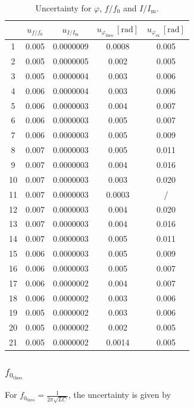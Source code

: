 \documentclass{article}
\begin{document}
\begin{table}[H]\centering
    \begin{tabular}{ccccc}
        \toprule
           & $u_{f/f_0}$ & $u_{I/I_\text{m}}$ & $u_{\varphi_\text{theo}}\,[\text{rad}]$ & $u_{\varphi_\text{ex}}\,[\text{rad}]$ \\
        \midrule
1 & 0.005 & 0.0000009 & 0.0008 & 0.005 \\
2 & 0.005 & 0.0000005 & 0.002 & 0.005 \\
3 & 0.005 & 0.0000004 & 0.003 & 0.006 \\
4 & 0.006 & 0.0000004 & 0.003 & 0.006 \\
5 & 0.006 & 0.0000003 & 0.004 & 0.007 \\
6 & 0.006 & 0.0000003 & 0.005 & 0.007 \\
7 & 0.006 & 0.0000003 & 0.005 & 0.009 \\
8 & 0.007 & 0.0000003 & 0.005 & 0.011 \\
9 & 0.007 & 0.0000003 & 0.004 & 0.016 \\
10 & 0.007 & 0.0000003 & 0.003 & 0.020 \\
11 & 0.007 & 0.0000003 & 0.0003 & / \\
12 & 0.007 & 0.0000003 & 0.004 & 0.020 \\
13 & 0.007 & 0.0000003 & 0.004 & 0.016 \\
14 & 0.007 & 0.0000003 & 0.005 & 0.011 \\
15 & 0.006 & 0.0000003 & 0.005 & 0.009 \\
16 & 0.006 & 0.0000003 & 0.005 & 0.007 \\
17 & 0.006 & 0.0000002 & 0.004 & 0.007 \\
18 & 0.006 & 0.0000002 & 0.003 & 0.006 \\
19 & 0.005 & 0.0000002 & 0.003 & 0.006 \\
20 & 0.005 & 0.0000002 & 0.002 & 0.005 \\
21 & 0.005 & 0.0000002 & 0.0014 & 0.005 \\
        \bottomrule
    \end{tabular}
    \caption{Uncertainty for $\varphi$, $f/f_0$ and $I/I_\text{m}$.}\label{TableUnc}
\end{table}

\subsubsection{$f_{0_{\text{theo}}}$}

For $f_{0_\text{{theo}}} = \frac{1}{2\pi\sqrt{LC}}$, the uncertainty is given by
\end{document}
